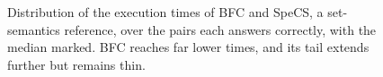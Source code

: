 \begin{figure}[!t]
  \centering
  
  \caption{Distribution of the execution times of \acs{BFC} and SpeCS, a set-semantics reference, over the pairs each answers correctly, with the median marked.
\acs{BFC} reaches far lower times, and its tail extends further but remains thin.}
  \label{fig:all_suites_bfc_specs}
\end{figure}
